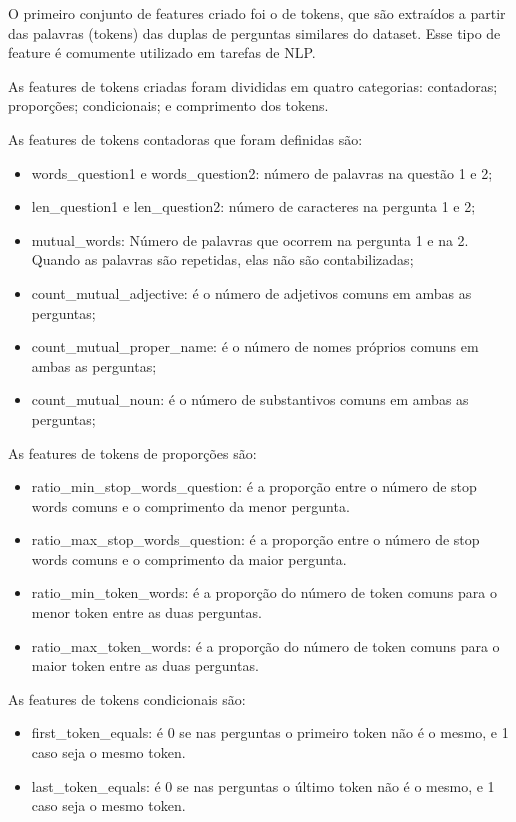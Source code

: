 \documentclass[conference]{IEEEtran}
\begin{document}
O primeiro conjunto de features criado foi o de tokens, que são extraídos a partir das palavras (tokens) das duplas de perguntas similares do dataset. Esse tipo de feature é comumente utilizado em tarefas de NLP.

As features de tokens criadas foram divididas em quatro categorias: contadoras; proporções; condicionais; e comprimento dos tokens.

As features de tokens contadoras que foram definidas são:
\begin{itemize}
\item words\_question1 e words\_question2: número de palavras na questão 1 e 2;
\item len\_question1 e len\_question2: número de caracteres na pergunta 1 e 2;
\item mutual\_words: Número de palavras que ocorrem na pergunta 1 e na 2. Quando as palavras são repetidas, elas não são contabilizadas;
\item count\_mutual\_adjective: é o número de adjetivos comuns em ambas as perguntas;
\item count\_mutual\_proper\_name: é o número de nomes próprios comuns em ambas as perguntas;
 \item count\_mutual\_noun: é o número de substantivos comuns em ambas as perguntas;
\end{itemize}

As features de tokens de proporções são:
\begin{itemize}
\item ratio\_min\_stop\_words\_question: é a proporção entre o número de stop words comuns e o comprimento da menor pergunta.
\item ratio\_max\_stop\_words\_question: é a proporção entre o número de stop words comuns e o comprimento da maior pergunta.
\item ratio\_min\_token\_words: é a proporção do número de token comuns para o menor token entre as duas perguntas.
\item ratio\_max\_token\_words: é a proporção do número de token comuns para o maior token entre as duas perguntas.
\end{itemize}

As features de tokens condicionais são:
\begin{itemize}
\item first\_token\_equals: é 0 se nas perguntas o primeiro token não é o mesmo, e 1 caso seja o mesmo token.
\item last\_token\_equals: é 0 se nas perguntas o último token não é o mesmo, e 1 caso seja o mesmo token.
\end{itemize}
\end{document}
